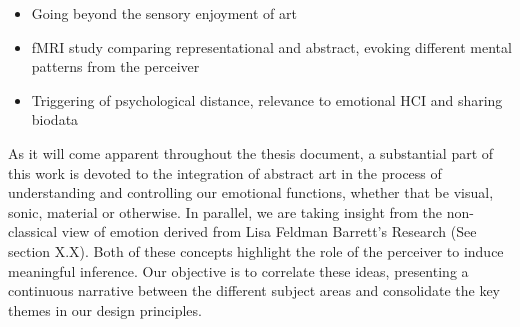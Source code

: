 \begin{itemize}
\item Going beyond the sensory enjoyment of art
\item fMRI study comparing representational and abstract, evoking different mental patterns from the perceiver
\item Triggering of psychological distance, relevance to emotional HCI and sharing biodata
\end{itemize}

As it will come apparent throughout the thesis document, a substantial part of this work is devoted to the integration of abstract art in the process of understanding and controlling our emotional functions, whether that be visual, sonic, material or otherwise. In parallel, we are taking insight from the non-classical view of emotion derived from Lisa Feldman Barrett's Research (See section X.X). Both of these concepts highlight the role of the perceiver to induce meaningful inference. Our objective is to correlate these ideas, presenting a continuous narrative between the different subject areas and consolidate the key themes in our design principles.  

